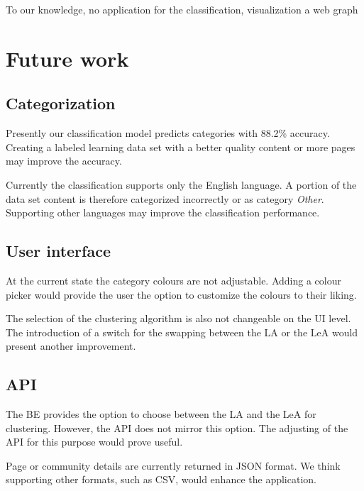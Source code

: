 To our knowledge, no application for the classification, visualization a web graph


\section{Future work}
\subsection{Categorization}
Presently our classification model predicts categories with 88.2\% accuracy. Creating a labeled learning data set with a better quality content or more pages may improve the accuracy. 

Currently the classification supports only the English language. A portion of the data set content is therefore categorized incorrectly or as category \textit{Other}. Supporting other languages may improve the classification performance. 
\subsection{User interface}
At the current state the category colours are not adjustable. Adding a colour picker would provide the user the option to customize the colours to their liking.

The selection of the clustering algorithm is also not changeable on the UI level. The introduction of a switch for the swapping between the LA or the LeA would present another improvement.
\subsection{API}
The BE provides the option to choose between the LA and the LeA for clustering. However, the API does not mirror this option. The adjusting of the API for this purpose would prove useful. 

Page or community details are currently returned in JSON format. We think supporting other formats, such as CSV, would enhance the application.
